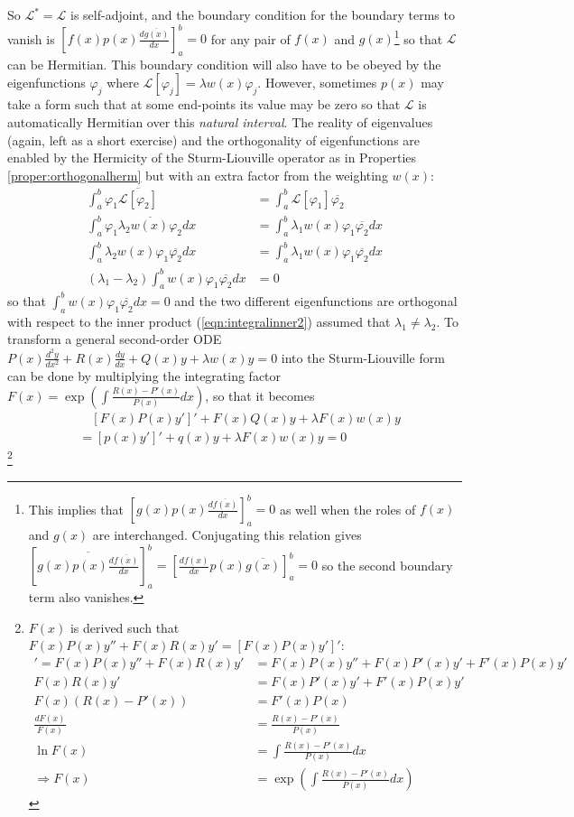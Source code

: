 So $\mathcal{L}^* = \mathcal{L}$ is self-adjoint, and the boundary condition for the boundary terms to vanish is $[f(x) p(x) \frac{d\overline{g(x)}}{dx}]_a^b = 0$ for any pair of $f(x)$ and $g(x)$\footnote{This implies that $[g(x) p(x) \frac{d\overline{f(x)}}{dx}]_a^b = 0$ as well when the roles of $f(x)$ and $g(x)$ are interchanged. Conjugating this relation gives $[\overline{g(x) p(x) \frac{d\overline{f(x)}}{dx}}]_a^b= [\frac{df(x)}{dx} p(x) \overline{g(x)}]_a^b = 0$ so the second boundary term also vanishes.} so that $\mathcal{L}$ can be Hermitian. This boundary condition will also have to be obeyed by the eigenfunctions $\varphi_j$ where $\mathcal{L}[\varphi_j] = \lambda w(x)\varphi_j$. However, sometimes $p(x)$ may take a form such that at some end-points its value may be zero so that $\mathcal{L}$ is automatically Hermitian over this \textit{natural interval}. The reality of eigenvalues (again, left as a short exercise) and the orthogonality of eigenfunctions are enabled by the Hermicity of the Sturm-Liouville operator as in Properties \ref{proper:orthogonalherm} but with an extra factor from the weighting $w(x)$:
\begin{align*}
\int_a^b \varphi_1\overline{\mathcal{L}[\varphi_2]} &= \int_a^b \mathcal{L}[\varphi_1]\overline{\varphi_2} \\
\int_a^b \varphi_1\overline{\lambda_2 w(x)\varphi_2} dx &= \int_a^b \lambda_1 w(x)\varphi_1\overline{\varphi_2} dx \\
\int_a^b \lambda_2 w(x)\varphi_1 \overline{\varphi_2} dx &= \int_a^b \lambda_1 w(x)\varphi_1\overline{\varphi_2} dx \\
(\lambda_1 - \lambda_2) \int_a^b w(x)\varphi_1 \overline{\varphi_2} dx &= 0
\end{align*}
so that $\int_a^b w(x)\varphi_1 \overline{\varphi_2} dx = 0$ and the two different eigenfunctions are orthogonal with respect to the inner product (\ref{eqn:integralinner2}) assumed that $\lambda_1 \neq \lambda_2$. To transform a general second-order ODE $P(x)\frac{d^2y}{dx^2} + R(x)\frac{dy}{dx} + Q(x)y + \lambda w(x)y = 0$ into the Sturm-Liouville form can be done by multiplying the integrating factor $F(x) = \exp(\int \frac{R(x) - P'(x)}{P(x)} dx)$, so that it becomes
\begin{align*}
&\quad [F(x)P(x)y']' + F(x)Q(x)y + \lambda F(x)w(x)y \\
&= [p(x)y']' + q(x)y + \lambda F(x)w(x)y = 0
\end{align*}
\footnote{$F(x)$ is derived such that $F(x)P(x)y'' + F(x)R(x)y' = [F(x)P(x)y']'$:
\begin{align*}
[F(x)P(x)y']' = F(x)P(x)y'' + F(x)R(x)y' &= F(x)P(x)y'' + F(x)P'(x)y' + F'(x)P(x)y' \\
F(x)R(x)y' &=  F(x)P'(x)y' + F'(x)P(x)y' \\
F(x)(R(x) - P'(x)) &= F'(x)P(x) \\
\frac{dF(x)}{F(x)} &= \frac{R(x) - P'(x)}{P(x)} \\
\ln F(x) &= \int \frac{R(x) - P'(x)}{P(x)} dx \\
\Rightarrow F(x) &= \exp(\int \frac{R(x) - P'(x)}{P(x)} dx)
\end{align*}}

